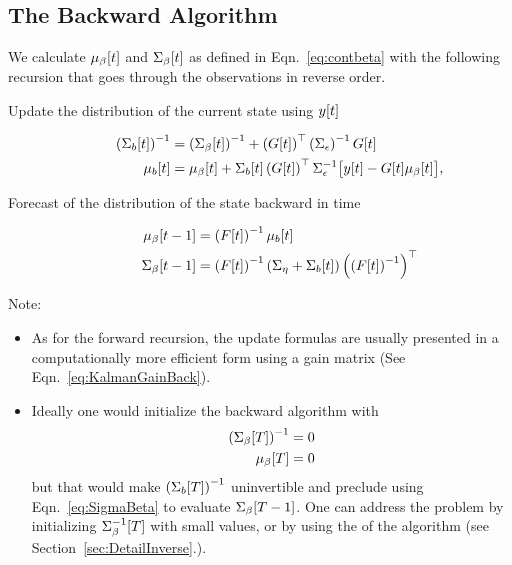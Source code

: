 \subsection{The Backward Algorithm}

We calculate ${\mu_\beta}{[t]}$ and ${\Sigma_\beta}{[t]}$ as defined
in Eqn.~\eqref{eq:contbeta} with the following recursion that goes
through the observations in reverse order.

\begin{description}
\item[Update the distribution of the current state using ${y}{[t]}$]
  \begin{subequations}
    \label{eq:BUpdate}
    \begin{align}
    \left({\Sigma_b}{[t]} \right)^{-1} &= \left({\Sigma_\beta}{[t]}
    \right)^{-1} + \left( {G}{[t]} \right)^\top
    \left(\Sigma_\epsilon
    \right)^{-1} {G}{[t]} \\
        {\mu_b}{[t]} &= {\mu_\beta}{[t]} + {\Sigma_{b}}{[t]}
        \left( {G}{[t]} \right)^\top \Sigma_\epsilon^{-1}
        \big[{y}{[t]} - {G}{[t]} {\mu_\beta}{[t]}\big],
  \end{align}
  \end{subequations}
\item[Forecast of the distribution of the state backward in time]
  \begin{subequations}
    \label{eq:BFore}
    \begin{align}
      {\mu_\beta}{[t-1]} &= \left( {F}{[t]} \right)^{-1}
      {\mu_b}{[t]} \\
      \label{eq:SigmaBeta}
      {\Sigma_\beta}{[t-1]} &= \left( {F}{[t]} \right)^{-1} \left(
        \Sigma_\eta + {\Sigma_b}{[t]} \right) \left( \left( {F}{[t]}
        \right)^{-1} \right)^\top
    \end{align}
  \end{subequations}
\end{description}
Note:
\begin{itemize}
\item As for the forward recursion, the update formulas are usually
  presented in a computationally more efficient form using a gain
  matrix (See Eqn.~\eqref{eq:KalmanGainBack}).
\item Ideally one would initialize the backward algorithm with
  \begin{align*}
    \left( {\Sigma_\beta}{[T]} \right)^{-1} &= 0\\
    {\mu_\beta}{[T]} &= 0
  \end{align*}
  but that would make $\left( {\Sigma_b}{[T]} \right)^{-1}$
  uninvertible and preclude using Eqn.~\eqref{eq:SigmaBeta} to
  evaluate ${\Sigma_\beta}{[T-1]}$.  One can address the problem by
  initializing ${\Sigma_\beta^{-1}}{[T]}$ with small values, or by using
  the \emph{} of the algorithm (see
  Section~\ref{sec:DetailInverse}.).
\end{itemize}

